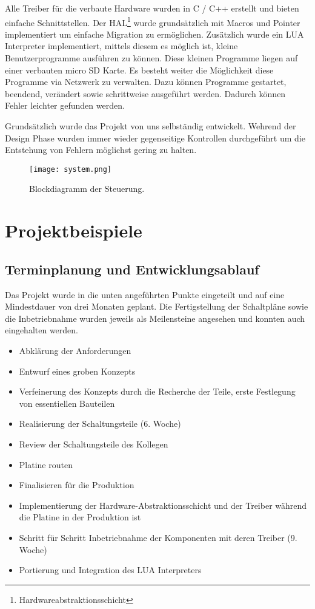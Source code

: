 \documentclass[praktikum,german]{hgbthesis}
\begin{document}
Alle Treiber für die verbaute Hardware wurden in C / C++ erstellt und bieten einfache Schnittstellen. Der HAL\footnote{Hardwareabstraktionsschicht} wurde grundsätzlich mit Macros und Pointer implementiert um einfache Migration zu ermöglichen. Zusätzlich wurde ein LUA Interpreter implementiert, mittels diesem es möglich ist, kleine Benutzerprogramme ausführen zu können. Diese kleinen Programme liegen auf einer verbauten micro SD Karte. Es besteht weiter die Möglichkeit diese Programme via Netzwerk zu verwalten. Dazu können Programme gestartet, beendend, verändert sowie schrittweise ausgeführt werden. Dadurch können Fehler leichter gefunden werden.

Grundsätzlich wurde das Projekt von uns selbständig entwickelt. Wehrend der Design Phase wurden immer wieder gegenseitige Kontrollen durchgeführt um die Entstehung von Fehlern möglichst gering zu halten.

\begin{figure}[H]
\centering
\texttt{[image: system.png]}
\caption{Blockdiagramm der Steuerung.}
\label{fig:ideaBlock}
\end{figure}

\chapter{Projektbeispiele}

\section{Terminplanung und Entwicklungsablauf}
Das Projekt wurde in die unten angeführten Punkte eingeteilt und auf eine Mindestdauer von drei Monaten geplant. Die Fertigstellung der Schaltpläne sowie die Inbetriebnahme wurden jeweils als Meilensteine angesehen und konnten auch eingehalten werden.

\begin{itemize}
\item Abklärung der Anforderungen
\item Entwurf eines groben Konzepts
\item Verfeinerung des Konzepts durch die Recherche der Teile, erste Festlegung von essentiellen Bauteilen
\item Realisierung der Schaltungsteile (6. Woche)
\item Review der Schaltungsteile des Kollegen
\item Platine routen
\item Finalisieren für die Produktion
\item Implementierung der Hardware-Abstraktionsschicht und der Treiber während die Platine in der Produktion ist
\item Schritt für Schritt Inbetriebnahme der Komponenten mit deren Treiber (9. Woche)
\item Portierung und Integration des LUA Interpreters
\end{itemize}
\end{document}
